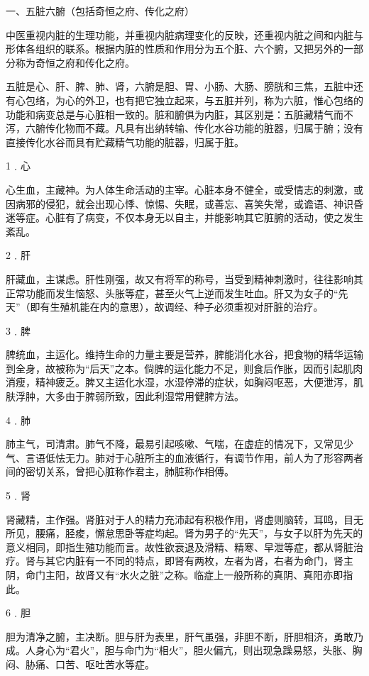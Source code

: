 \documentclass[12pt,UTF8]{ctexbook}
\begin{document}
一、五脏六腑（包括奇恒之府、传化之府）

中医重视内脏的生理功能，并重视内脏病理变化的反映，还重视内脏之间和内脏与形体各组织的联系。根据内脏的性质和作用分为五个脏、六个腑，又把另外的一部分称为奇恒之府和传化之府。

五脏是心、肝、脾、肺、肾，六腑是胆、胃、小肠、大肠、膀胱和三焦，五脏中还有心包络，为心的外卫，也有把它独立起来，与五脏并列，称为六脏，惟心包络的功能和病变总是与心脏相一致的。脏和腑俱为内脏，其区别是：五脏藏精气而不泻，六腑传化物而不藏。凡具有出纳转输、传化水谷功能的脏器，归属于腑；没有直接传化水谷而具有贮藏精气功能的脏器，归属于脏。

1﹒心

心生血，主藏神。为人体生命活动的主宰。心脏本身不健全，或受情志的刺激，或因病邪的侵犯，就会出现心悸、惊惕、失眠，或善忘、喜笑失常，或谵语、神识昏迷等症。心脏有了病变，不仅本身无以自主，并能影响其它脏腑的活动，使之发生紊乱。

2﹒肝

肝藏血，主谋虑。肝性刚强，故又有将军的称号，当受到精神刺激时，往往影响其正常功能而发生恼怒、头胀等症，甚至火气上逆而发生吐血。肝又为女子的“先天”（即有生殖机能在内的意思），故调经、种子必须重视对肝脏的治疗。

3﹒脾

脾统血，主运化。维持生命的力量主要是营养，脾能消化水谷，把食物的精华运输到全身，故被称为“后天”之本。倘脾的运化能力不足，则食后作胀，因而引起肌肉消瘦，精神疲乏。脾又主运化水湿，水湿停滞的症状，如胸闷呕恶，大便泄泻，肌肤浮肿，大多由于脾弱所致，因此利湿常用健脾方法。

4﹒肺

肺主气，司清肃。肺气不降，最易引起咳嗽、气喘，在虚症的情况下，又常见少气、言语低怯无力。肺对于心脏所主的血液循行，有调节作用，前人为了形容两者间的密切关系，曾把心脏称作君主，肺脏称作相傅。

5﹒肾

肾藏精，主作强。肾脏对于人的精力充沛起有积极作用，肾虚则脑转，耳鸣，目无所见，腰痛，胫痠，懈怠思卧等症均起。肾为男子的“先天”，与女子以肝为先天的意义相同，即指生殖功能而言。故性欲衰退及滑精、精寒、早泄等症，都从肾脏治疗。肾与其它内脏有一不同的特点，即肾有两枚，左者为肾，右者为命门，肾主阴，命门主阳，故肾又有“水火之脏”之称。临症上一般所称的真阴、真阳亦即指此。

6﹒胆

胆为清净之腑，主决断。胆与肝为表里，肝气虽强，非胆不断，肝胆相济，勇敢乃成。人身心为“君火”，胆与命门为“相火”，胆火偏亢，则出现急躁易怒，头胀、胸闷、胁痛、口苦、呕吐苦水等症。
\end{document}
